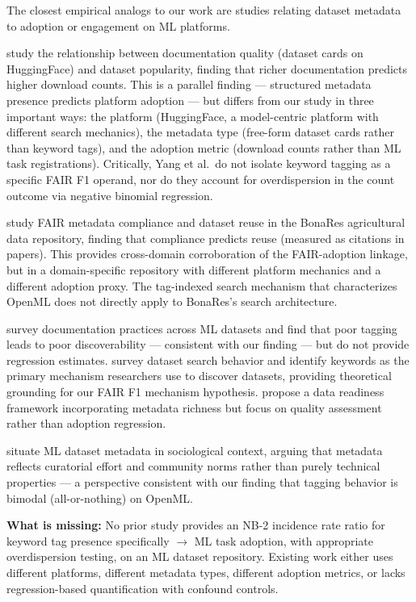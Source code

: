The closest empirical analogs to our work are studies relating dataset metadata to adoption or engagement on ML platforms.

\citet{Yang2024Navigating} study the relationship between documentation quality (dataset cards on HuggingFace) and dataset popularity, finding that richer documentation predicts higher download counts. This is a parallel finding --- structured metadata presence predicts platform adoption --- but differs from our study in three important ways: the platform (HuggingFace, a model-centric platform with different search mechanics), the metadata type (free-form dataset cards rather than keyword tags), and the adoption metric (download counts rather than ML task registrations). Critically, Yang et al.\ do not isolate keyword tagging as a specific FAIR F1 operand, nor do they account for overdispersion in the count outcome via negative binomial regression.

\citet{Lachmuth2025BonaRes} study FAIR metadata compliance and dataset reuse in the BonaRes agricultural data repository, finding that compliance predicts reuse (measured as citations in papers). This provides cross-domain corroboration of the FAIR-adoption linkage, but in a domain-specific repository with different platform mechanics and a different adoption proxy. The tag-indexed search mechanism that characterizes OpenML does not directly apply to BonaRes's search architecture.

\citet{Oreamuno2023State} survey documentation practices across ML datasets and find that poor tagging leads to poor discoverability --- consistent with our finding --- but do not provide regression estimates. \citet{Chapman2019Dataset} survey dataset search behavior and identify keywords as the primary mechanism researchers use to discover datasets, providing theoretical grounding for our FAIR F1 mechanism hypothesis. \citet{Afzal2020Data} propose a data readiness framework incorporating metadata richness but focus on quality assessment rather than adoption regression.

\citet{Orr2024Social} situate ML dataset metadata in sociological context, arguing that metadata reflects curatorial effort and community norms rather than purely technical properties --- a perspective consistent with our finding that tagging behavior is bimodal (all-or-nothing) on OpenML.

\textbf{What is missing:} No prior study provides an NB-2 incidence rate ratio for keyword tag presence specifically $\rightarrow$ ML task adoption, with appropriate overdispersion testing, on an ML dataset repository. Existing work either uses different platforms, different metadata types, different adoption metrics, or lacks regression-based quantification with confound controls.

